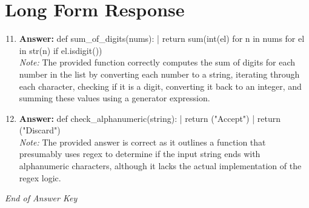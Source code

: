 \documentclass[12pt]{article}
\begin{document}
\section*{Long Form Response}
\begin{enumerate}[label=\arabic*.]
\setcounter{enumi}{10}
\item \textbf{Answer:} def sum\_of\_digits(nums): | return sum(int(el) for n in nums for el in str(n) if el.isdigit())
\\ \textit{Note:} The provided function correctly computes the sum of digits for each number in the list by converting each number to a string, iterating through each character, checking if it is a digit, converting it back to an integer, and summing these values using a generator expression.
\item \textbf{Answer:} def check\_alphanumeric(string): | return ("Accept") | return ("Discard")
\\ \textit{Note:} The provided answer is correct as it outlines a function that presumably uses regex to determine if the input string ends with alphanumeric characters, although it lacks the actual implementation of the regex logic.
\end{enumerate}

\vfill
\noindent\textit{End of Answer Key}
\end{document}
